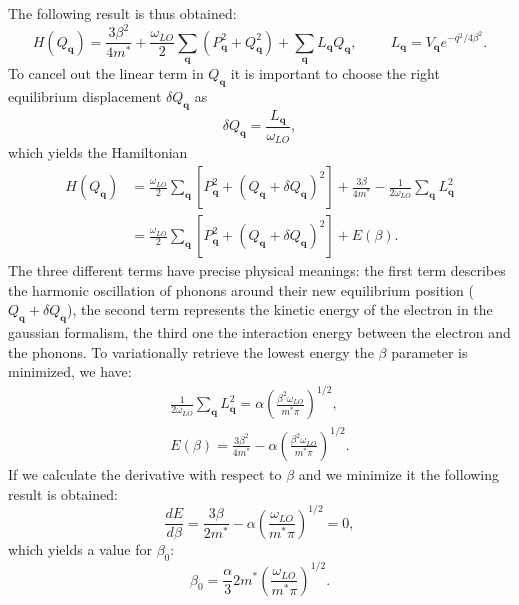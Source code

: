 The following result is thus obtained:
\begin{equation}
    H(Q_\mathbf{q})=\frac{3\beta^2}{4m^*}+\frac{\omega_{LO}}{2}\sum_\mathbf{q}(P_\mathbf{q}^2+Q_\mathbf{q}^2)+\sum_\mathbf{q}L_\mathbf{q}Q_\mathbf{q},\hspace{1cm}L_\mathbf{q}=V_\mathbf{q}e^{-q^2/4\beta^2}.
\end{equation}
To cancel out the linear term in $Q_\mathbf{q}$ it is important to choose the right equilibrium displacement $\delta Q_\mathbf{q}$ as
\begin{equation}
    \delta Q_\mathbf{q}=\frac{L_\mathbf{q}}{\omega_{LO}},
\end{equation}
which yields the Hamiltonian
\begin{equation}
\begin{split}
    H(Q_\mathbf{q})&=\frac{\omega_{LO}}{2}\sum_\mathbf{q}\left[P^2_\mathbf{q}+(Q_\mathbf{q}+\delta Q_\mathbf{q})^2\right]+\frac{3\beta}{4m^*}-\frac{1}{2\omega_{LO}}\sum_\mathbf{q}L^2_\mathbf{q}\\
    &=\frac{\omega_{LO}}{2}\sum_\mathbf{q}\left[P^2_\mathbf{q}+\left(Q_\mathbf{q}+\delta Q_\mathbf{q}\right)^2\right]+E(\beta).
\end{split}
\end{equation}
The three different terms have precise physical meanings: the first term describes the harmonic oscillation of phonons around their new 
equilibrium position ($Q_\mathbf{q}+\delta Q_\mathbf{q}$), the second term represents the kinetic energy of the electron in the gaussian 
formalism, the third one the interaction energy between the electron and the phonons. To variationally retrieve the lowest energy the 
$\beta$ parameter is minimized, we have:
\begin{equation}
\begin{split}
    \frac{1}{2\omega_{LO}}\sum_\mathbf{q}L^2_\mathbf{q}=\alpha\left(\frac{\beta^2\omega_{LO}}{m^*\pi}\right)^{1/2},\\
    E(\beta)=\frac{3\beta^2}{4m^*}-\alpha\left(\frac{\beta^2\omega_{LO}}{m^*\pi}\right)^{1/2}.
\end{split}
\end{equation}
If we calculate the derivative with respect to $\beta$ and we minimize it the following result is obtained:
\begin{equation}
    \frac{dE}{d\beta}=\frac{3\beta}{2m^*}-\alpha\left(\frac{\omega_{LO}}{m^*\pi}\right)^{1/2}=0,
\end{equation}
which yields a value for $\beta_0$:
\begin{equation}
    \beta_0=\frac{\alpha}{3}2m^*\left(\frac{\omega_{LO}}{m^*\pi}\right)^{1/2}.
\end{equation}
